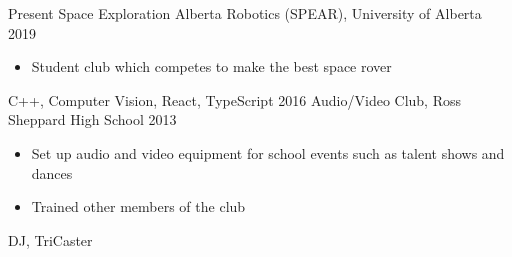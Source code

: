 
\begin{experiences}
  \experience
    {Present}   {Space Exploration Alberta Robotics (SPEAR), }{University of Alberta}{}
    {2019} {
                      \begin{itemize}
                        \item Student club which competes to make the best space rover
                      \end{itemize}
                    }
                    {
                        C++,
                        Computer Vision,
                        React,
                        TypeScript
                    }
  \experience
  {2016}   {Audio/Video Club, }{Ross Sheppard High School}{}
  {2013} {
                    \begin{itemize}
                      \item Set up audio and video equipment for school events such as talent shows and dances
                      \item Trained other members of the club
                    \end{itemize}
                  }
                  {
                      DJ,
                      TriCaster
                  }

\end{experiences}